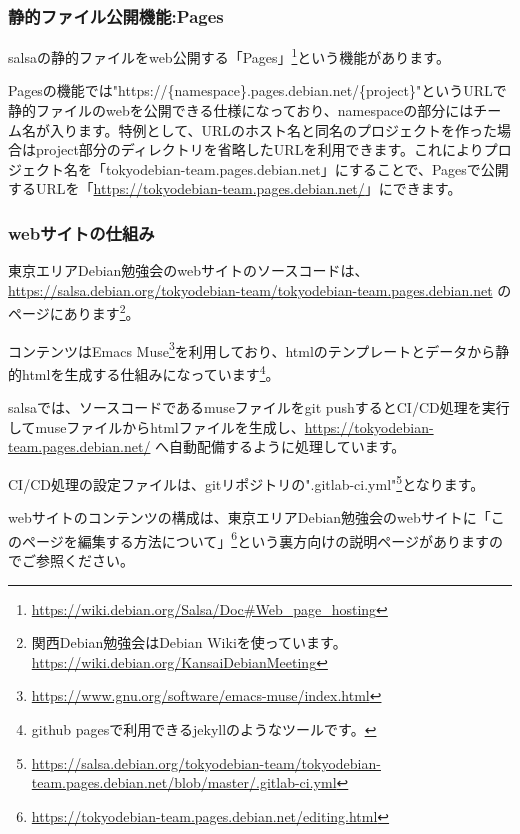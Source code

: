 \documentclass[mingoth,a4paper]{jsarticle}
\begin{document}
\subsubsection{静的ファイル公開機能:Pages}

salsaの静的ファイルをweb公開する「Pages」\footnote{\url{https://wiki.debian.org/Salsa/Doc\#Web_page_hosting}}という機能があります。


Pagesの機能では"https://\{namespace\}.pages.debian.net/\{project\}"というURLで静的ファイルのwebを公開できる仕様になっており、namespaceの部分にはチーム名が入ります。特例として、URLのホスト名と同名のプロジェクトを作った場合はproject部分のディレクトリを省略したURLを利用できます。これによりプロジェクト名を「tokyodebian-team.pages.debian.net」にすることで、Pagesで公開するURLを「\url{https://tokyodebian-team.pages.debian.net/}」にできます。


\subsubsection{webサイトの仕組み}

東京エリアDebian勉強会のwebサイトのソースコードは、\url{https://salsa.debian.org/tokyodebian-team/tokyodebian-team.pages.debian.net} のページにあります\footnote{関西Debian勉強会はDebian Wikiを使っています。\url{https://wiki.debian.org/KansaiDebianMeeting}}。


コンテンツはEmacs Muse\footnote{\url{https://www.gnu.org/software/emacs-muse/index.html}}を利用しており、htmlのテンプレートとデータから静的htmlを生成する仕組みになっています\footnote{github pagesで利用できるjekyllのようなツールです。}。


salsaでは、ソースコードであるmuseファイルをgit pushするとCI/CD処理を実行してmuseファイルからhtmlファイルを生成し、\url{https://tokyodebian-team.pages.debian.net/} へ自動配備するように処理しています。


CI/CD処理の設定ファイルは、gitリポジトリの".gitlab-ci.yml"\footnote{\url{https://salsa.debian.org/tokyodebian-team/tokyodebian-team.pages.debian.net/blob/master/.gitlab-ci.yml}}となります。


webサイトのコンテンツの構成は、東京エリアDebian勉強会のwebサイトに「このページを編集する方法について」\footnote{\url{https://tokyodebian-team.pages.debian.net/editing.html}}という裏方向けの説明ページがありますのでご参照ください。
\end{document}
